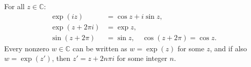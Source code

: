 For all $z \in \mathbb{C}$:
\begin{align}
\exp(iz) &= \cos z + i \sin z, \\
\exp(z + 2\pi i) &= \exp z, \\
\sin(z + 2\pi) &= \sin z, \quad \cos(z + 2\pi) = \cos z.
\end{align}
Every nonzero $w \in \mathbb{C}$ can be written as $w = \exp(z)$ for some $z$, and if also $w = \exp(z')$, then $z' = z + 2n\pi i$ for some integer $n$.
